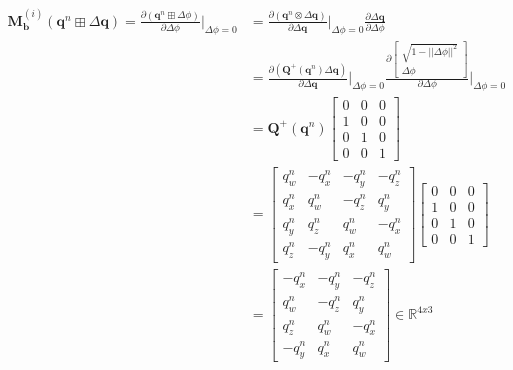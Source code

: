 \documentclass[12pt]{report}
\numberwithin{figure}{section}
\newcommand{\R}{\mathbb{R}}
\begin{document}
\begin{appendices}
\begin{equation}
  \begin{aligned}
  \mathbf{M}^{(i)}_{\mathbf{b}}(\mathbf{q}^n \boxplus \Delta \mathbf{q}) = 
    \frac{\partial (\mathbf{q}^{n} \boxplus \Delta \phi)}{\partial \Delta \phi} 
    \bigg|_{\Delta \phi = 0} & =
\frac{\partial (\mathbf{q}^{n} \otimes \Delta \mathbf{q})}{\partial \Delta \mathbf{q}}
    \bigg|_{\Delta \phi = 0} 
    \frac{\partial \Delta \mathbf{q}}{\partial \Delta \phi} \\
    & =
    \frac{\partial (\mathbf{Q}^{+}(\mathbf{q}^{n}) \Delta \mathbf{q})}{\partial \Delta \mathbf{q}}
    \bigg|_{\Delta \phi = 0}
    \frac{\partial \begin{bmatrix} \sqrt{1-||\Delta \phi||^2} \\ \Delta \phi \end{bmatrix}}{\partial \Delta \phi}
    \bigg|_{\Delta \phi = 0} \\
    & =
\mathbf{Q}^{+}(\mathbf{q}^{n})
      \begin{bmatrix} 
        0 & 0 & 0 \\  
        1 & 0 & 0 \\  
        0 & 1 & 0 \\  
        0 & 0 & 1
      \end{bmatrix} \\
    & =
      \begin{bmatrix} 
        q_w^{n} & -q_x^{n} & -q_y^{n} & -q_z^{n}\\  
        q_x^{n} & q_w^{n} & -q_z^{n} & q_y^{n}\\  
        q_y^{n} & q_z^{n} & q_w^{n} & -q_x^{n}\\
        q_z^{n} & -q_y^{n} & q_x^{n} & q_w^{n}
      \end{bmatrix}
      \begin{bmatrix} 
        0 & 0 & 0 \\  
        1 & 0 & 0 \\  
        0 & 1 & 0 \\  
        0 & 0 & 1
      \end{bmatrix} \\ 
      & = 
      \begin{bmatrix} 
        -q_x^{n} & -q_y^{n} & -q_z^{n}\\  
        q_w^{n} & -q_z^{n} & q_y^{n}\\  
        q_z^{n} & q_w^{n} & -q_x^{n}\\
        -q_y^{n} & q_x^{n} & q_w^{n}
      \end{bmatrix} \in \R^{4x3}
  \end{aligned}
\end{equation}


\end{appendices}
\end{document}
